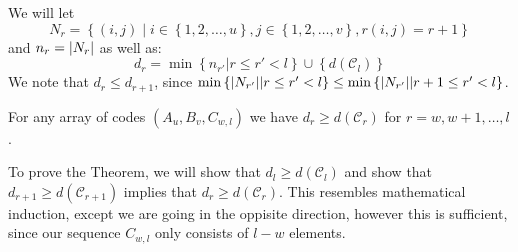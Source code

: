 We will let
\begin{equation*}
N_r = \left\{(i, j) \middle| i \in \left\{1, 2, \ldots, u\right\}, j \in \left\{1, 2, \ldots, v\right\}, r(i,j) = r + 1\right\}
\end{equation*}
and $n_r = \left\lvert N_r\right\rvert$ as well as:
\begin{equation*}
  d_r = \min \left\{n_{r'} | r \leq r' < l\right\} \cup \left\{d(\mathcal{C}_l)\right\}
\end{equation*}
We note that $d_r \leq d_{r + 1}$, since $\min \left\{\left\lvert N_{r'}\right\rvert \middle| r \leq r' < l \right\} \leq \min \left\{\left\lvert N_{r'}\right\rvert \middle| r + 1 \leq r' < l\right\}$.
\begin{theorem}\label{thm:d_r_bounded_by_min_distance}
For any array of codes $(A_u, B_v, C_{w, l})$ we have $d_r \geq d(\mathcal{C}_r)$ for $r = w, w + 1, \ldots, l$.
\end{theorem}
To prove the Theorem, we will show that $d_l \geq d(\mathcal{C}_l)$ and show that $d_{r + 1} \geq d(\mathcal{C}_{r + 1})$ implies that $d_r \geq d(\mathcal{C}_r)$. This resembles mathematical induction, except we are going in the oppisite direction, however this is sufficient, since our sequence $C_{w, l}$ only consists of $l - w$ elements.

